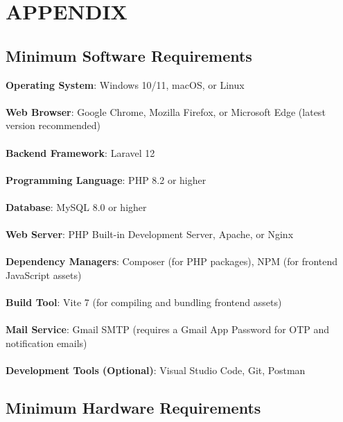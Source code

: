 \chapter{APPENDIX}

\section{Minimum Software Requirements}

\medskip
\textbf{Operating System}: Windows 10/11, macOS, or Linux
\\\\
\textbf{Web Browser}: Google Chrome, Mozilla Firefox, or Microsoft Edge (latest version recommended)
\\\\
\textbf{Backend Framework}: Laravel 12
\\\\
\textbf{Programming Language}: PHP 8.2 or higher
\\\\
\textbf{Database}: MySQL 8.0 or higher
\\\\
\textbf{Web Server}: PHP Built-in Development Server, Apache, or Nginx
\\\\
\textbf{Dependency Managers}: Composer (for PHP packages), NPM (for frontend JavaScript assets)
\\\\
\textbf{Build Tool}: Vite 7 (for compiling and bundling frontend assets)
\\\\
\textbf{Mail Service}: Gmail SMTP (requires a Gmail App Password for OTP and notification emails)
\\\\
\textbf{Development Tools (Optional)}: Visual Studio Code, Git, Postman

\section{Minimum Hardware Requirements}

